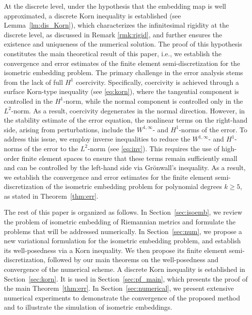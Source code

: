 \documentclass[11pt,a4paper,oneside,reqno]{amsart}
\theoremstyle{definition}
\theoremstyle{plain}
\numberwithin{theorem}{section}
\numberwithin{proposition}{section}
\numberwithin{lemma}{section}
\numberwithin{equation}{section}
\begin{document}
At the discrete level, under the hypothesis that the embedding map is well approximated, a discrete Korn inequality is established (see Lemma~\ref{lm:dis_Korn}), which characterizes the infinitesimal rigidity at the discrete level, as discussed in Remark \ref{rmk:rigid}, and further ensures the existence and uniqueness of the numerical solution.
The proof of this hypothesis constitutes the main theoretical result of this paper, i.e., we establish the convergence and error estimates of the finite element semi-discretization for the isometric embedding problem.
The primary challenge in the error analysis stems from the lack of full \(H^1\) coercivity. Specifically, coercivity is achieved through a surface Korn-type inequality (see \eqref{eq:korn}), where the tangential component is controlled in the \(H^1\)-norm, while the normal component is controlled only in the \(L^2\)-norm. As a result, coercivity degenerates in the normal direction.
However, in the stability estimate of the error equation, the nonlinear terms on the right-hand side, arising from perturbations, include the \(W^{1,\infty}\)- and \(H^1\)-norms of the error.
To address this issue, we employ inverse inequalities to reduce the \(W^{1,\infty}\)- and \(H^1\)-norms of the error to the \(L^2\)-norm (see \eqref{eq:inv}). This requires the use of high-order finite element spaces to ensure that these terms remain sufficiently small and can be controlled by the left-hand side via Gr\"onwall's inequality.
As a result, we establish the convergence and error estimates for the finite element semi-discretization of the isometric embedding problem for polynomial degrees \(k \ge 5\), as stated in Theorem~\ref{thm:err}.



The rest of this paper is organized as follows.
In Section~\ref{sec:isoemb}, we review the problem of isometric embedding of Riemannian metrics
and formulate the problems that will be addressed numerically.
In Section~\ref{sec:num}, we propose a new variational formulation for the isometric embedding problem,
and establish its well-posedness via a Korn inequality.
We then propose its finite element semi-discretization, followed by our main theorems on the well-posedness
and convergence of the numerical scheme.
A discrete Korn inequality is established in Section~\ref{sec:korn}.
It is used in Section~\ref{sec:pf_main}, which presents the proof of the main Theorem~\ref{thm:err}.
In Section~\ref{sec:numerical}, we present extensive numerical experiments to demonstrate the convergence
of the proposed method and to illustrate the simulation of isometric embeddings.
\end{document}

